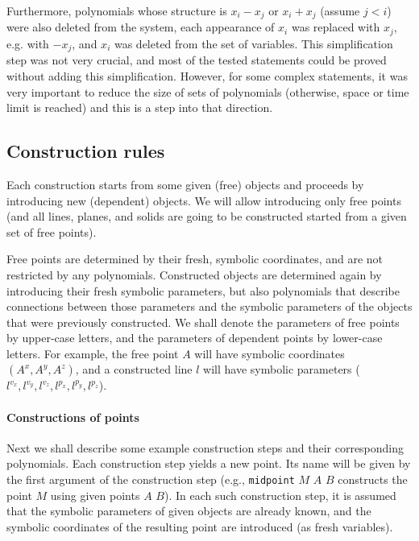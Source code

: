 \documentclass[final,1p,times,authoryear]{elsarticle}
\begin{document}
Furthermore, polynomials whose structure is $x_i - x_j$ or $x_i + x_j$
(assume $j < i$) were also deleted from the system, each appearance of
$x_i$ was replaced with $x_j$, e.g. with $-x_j$, and $x_i$ was deleted
from the set of variables. This simplification step was not very
crucial, and most of the tested statements could be proved without
adding this simplification. However, for some complex statements, it
was very important to reduce the size of sets of polynomials
(otherwise, space or time limit is reached) and this is a step into
that direction.


\subsection{Construction rules}


Each construction starts from some given (free) objects and proceeds
by introducing new (dependent) objects. We will allow introducing only
free points (and all lines, planes, and solids are going to be
constructed started from a given set of free points).

Free points are determined by their fresh, symbolic coordinates, and
are not restricted by any polynomials. Constructed objects are
determined again by introducing their fresh symbolic parameters, but
also polynomials that describe connections between those parameters
and the symbolic parameters of the objects that were previously
constructed. We shall denote the parameters of free points by
upper-case letters, and the parameters of dependent points by
lower-case letters. For example, the free point $A$ will have symbolic
coordinates $({A}^x, {A}^y, {A}^z)$, and a constructed line $l$ will
have symbolic parameters (${l}^{v_x}, {l}^{v_y}, {l}^{v_z}, {l}^{p_x},
{l}^{p_y}, {l}^{p_z}$).


\paragraph{Constructions of points}

Next we shall describe some example construction steps and their
corresponding polynomials. Each construction step yields a new
point. Its name will be given by the first argument of the
construction step (e.g., {\tt midpoint} $M$ $A$ $B$ constructs the
point $M$ using given points $A$ $B$). In each such construction step,
it is assumed that the symbolic parameters of given objects are
already known, and the symbolic coordinates of the resulting point are
introduced (as fresh variables).
\end{document}
